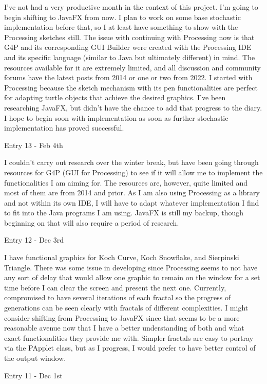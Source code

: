 \documentclass[]{final_report}
\begin{document}
I've not had a very productive month in the context of this project. I'm going to begin shifting to JavaFX from now. I plan to work on some base stochastic implementation before that, so I at least have something to show with the Processing sketches still. The issue with continuing with Processing now is that G4P and its corresponding GUI Builder were created with the Processing IDE and its specific language (similar to Java but ultimately different) in mind. The resources available for it are extremely limited, and all discussion and community forums have the latest posts from 2014 or one or two from 2022. I started with Processing because the sketch mechanism with its pen functionalities are perfect for adapting turtle objects that achieve the desired graphics. I've been researching JavaFX, but didn't have the chance to add that progress to the diary. I hope to begin soon with implementation as soon as further stochastic implementation has proved successful.

Entry 13 - Feb 4th

I couldn't carry out research over the winter break, but have been going through resources for G4P (GUI for Processing) to see if it will allow me to implement the functionalities I am aiming for. The resources are, however, quite limited and most of them are from 2014 and prior. As I am also using Processing as a library and not within its own IDE, I will have to adapt whatever implementation I find to fit into the Java programs I am using. JavaFX is still my backup, though beginning on that will also require a period of research.

Entry 12 - Dec 3rd

I have functional graphics for Koch Curve, Koch Snowflake, and Sierpinski Triangle. There was some issue in developing since Processing seems to not have any sort of delay that would allow one graphic to remain on the window for a set time before I can clear the screen and present the next one. Currently, compromised to have several iterations of each fractal so the progress of generations can be seen clearly with fractals of different complexities.
I might consider shifting from Processing to JavaFX since that seems to be a more reasonable avenue now that I have a better understanding of both and what exact functionalities they provide me with. Simpler fractals are easy to portray via the PApplet class, but as I progress, I would prefer to have better control of the output window.

Entry 11 - Dec 1st
\end{document}

